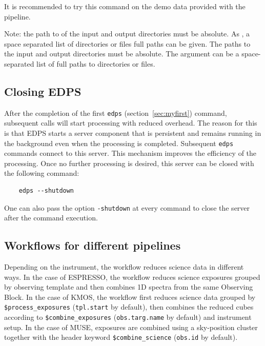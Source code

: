 It is recommended to try this command on the demo data provided with the pipeline. 

Note: the path to of the input and output directories must be absolute. As {\tt <input directory>}, a space separated list of directories or files full paths can be given.
The paths to the input and output directories must be absolute. The {\tt <input directory>} argument can be a space-separated list of full paths to directories or files.

\subsection{Closing EDPS}
\label{sec:edps_close}

After the  completion of the first {\tt edps} (section~\ref{sec:myfirst}) command, subsequent calls will start processing with reduced overhead. The reason for this is that EDPS starts a server component that is persistent and remains running in the background even when the processing is completed. Subsequent {\tt edps} commands connect to this server. This mechanism improves the efficiency of the processing. Once no further processing is desired, this server can be closed with the following command:

\begin{verbatim}
    edps --shutdown
\end{verbatim}

One can also pass the option {\tt -shutdown} at every command to close the server after the command execution.




\subsection{Workflows for different pipelines}
 
Depending on the instrument, the workflow reduces science data in different ways. In the case of ESPRESSO, the workflow reduces science exposures grouped by observing template and then combines 1D spectra from the same Observing Block. In the case of KMOS, the workflow first reduces science data grouped by {\tt \$process\_exposures} ({\tt tpl.start} by default), then combines the reduced cubes according to {\tt \$combine\_exposures} ({\tt obs.targ.name} by default) and instrument setup. In the case of MUSE, exposures are combined using a sky-position cluster together with the header keyword {\tt \$combine\_science} ({\tt obs.id} by default).

